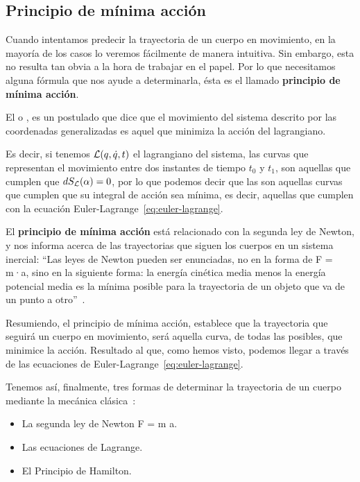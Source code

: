 \subsection{Principio de mínima acción}\label{subsec:principio-de-mínima-acción}

Cuando intentamos predecir la trayectoria de un cuerpo en movimiento, en la mayoría de los casos lo veremos fácilmente de manera intuitiva. Sin embargo, esta no resulta tan obvia a la hora de trabajar en el papel. Por lo que necesitamos alguna fórmula que nos ayude a determinarla, ésta es el llamado \textbf{principio de mínima acción}.

El  o , es un postulado que dice que el movimiento del sistema descrito por las coordenadas generalizadas es aquel que minimiza la acción del lagrangiano\label{po:pma}.

Es decir, si tenemos $\mathcal{L}(q,\dot{q}, t)$ el lagrangiano del sistema, las curvas que representan el movimiento entre dos instantes de tiempo $t_0$ y $t_1$, son aquellas que cumplen que $dS_{\mathcal{L}}(\alpha)=0$, por lo que podemos decir que las  son aquellas curvas que cumplen que su integral de acción sea mínima, es decir, aquellas que cumplen con la ecuación Euler-Lagrange~\eqref{eq:euler-lagrange}.

El \textbf{principio de mínima acción} está relacionado con la segunda ley de Newton, y nos informa acerca de las trayectorias que siguen los cuerpos en un sistema inercial:
``Las leyes de Newton pueden ser enunciadas, no en la forma de F = m·a, sino en la siguiente forma: la energía cinética media menos la energía potencial media es la mínima posible para la trayectoria de un objeto que va de un punto a otro''~\cite{Feynman}.

Resumiendo, el principio de mínima acción, establece que la trayectoria que seguirá un cuerpo en movimiento, será aquella curva, de todas las posibles, que minimice la acción. Resultado al que, como hemos visto, podemos llegar a través de las ecuaciones de Euler-Lagrange~\eqref{eq:euler-lagrange}.

Tenemos así, finalmente, tres formas de determinar la trayectoria de un cuerpo mediante la mecánica clásica~\autocite[264]{Taylor}:
\begin{itemize}
    \item La segunda ley de Newton F = m \cdot a.
    \item Las ecuaciones de Lagrange.
    \item El Principio de Hamilton.
\end{itemize}
